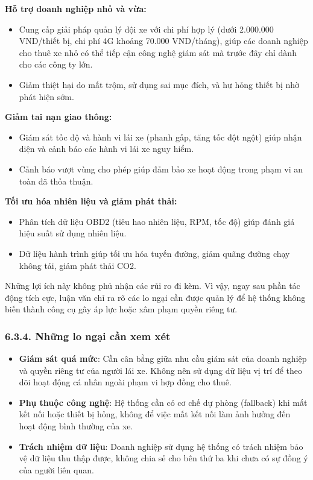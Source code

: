 \documentclass[a4paper]{extarticle}
\providecommand{\tightlist}{%
  \setlength{\itemsep}{0pt}\setlength{\parskip}{0pt}}
\begin{document}
\textbf{Hỗ trợ doanh nghiệp nhỏ và vừa:}

\begin{itemize}
\tightlist
\item
  Cung cấp giải pháp quản lý đội xe với chi phí hợp lý (dưới 2.000.000
  VND/thiết bị, chi phí 4G khoảng 70.000 VND/tháng), giúp các doanh
  nghiệp cho thuê xe nhỏ có thể tiếp cận công nghệ giám sát mà trước đây
  chỉ dành cho các công ty lớn.
\item
  Giảm thiệt hại do mất trộm, sử dụng sai mục đích, và hư hỏng thiết bị
  nhờ phát hiện sớm.
\end{itemize}

\textbf{Giảm tai nạn giao thông:}

\begin{itemize}
\tightlist
\item
  Giám sát tốc độ và hành vi lái xe (phanh gấp, tăng tốc đột ngột) giúp
  nhận diện và cảnh báo các hành vi lái xe nguy hiểm.
\item
  Cảnh báo vượt vùng cho phép giúp đảm bảo xe hoạt động trong phạm vi an toàn đã
  thỏa thuận.
\end{itemize}

\textbf{Tối ưu hóa nhiên liệu và giảm phát thải:}

\begin{itemize}
\tightlist
\item
  Phân tích dữ liệu OBD2 (tiêu hao nhiên liệu, RPM, tốc độ) giúp đánh
  giá hiệu suất sử dụng nhiên liệu.
\item
  Dữ liệu hành trình giúp tối ưu hóa tuyến đường, giảm quãng đường chạy
  không tải, giảm phát thải CO2.
\end{itemize}

Những lợi ích này không phủ nhận các rủi ro đi kèm. Vì vậy, ngay sau
phần tác động tích cực, luận văn chỉ ra rõ các lo ngại cần được quản lý
để hệ thống không biến thành công cụ gây áp lực hoặc xâm phạm quyền
riêng tư.

\subsubsection{6.3.4. Những lo ngại cần xem
xét}\label{634-nhux1eefng-lo-ngux1ea1i-cux1ea7n-xem-xuxe9t}

\begin{itemize}
\tightlist
\item
  \textbf{Giám sát quá mức}: Cần cân bằng giữa nhu cầu giám sát của
  doanh nghiệp và quyền riêng tư của người lái xe. Không nên sử dụng dữ
  liệu vị trí để theo dõi hoạt động cá nhân ngoài phạm vi hợp đồng cho
  thuê.
\item
  \textbf{Phụ thuộc công nghệ}: Hệ thống cần có cơ chế dự phòng
  (fallback) khi mất kết nối hoặc thiết bị hỏng, không để việc mất kết
  nối làm ảnh hưởng đến hoạt động bình thường của xe.
\item
  \textbf{Trách nhiệm dữ liệu}: Doanh nghiệp sử dụng hệ thống có trách
  nhiệm bảo vệ dữ liệu thu thập được, không chia sẻ cho bên thứ ba khi
  chưa có sự đồng ý của người liên quan.
\end{itemize}
\end{document}

